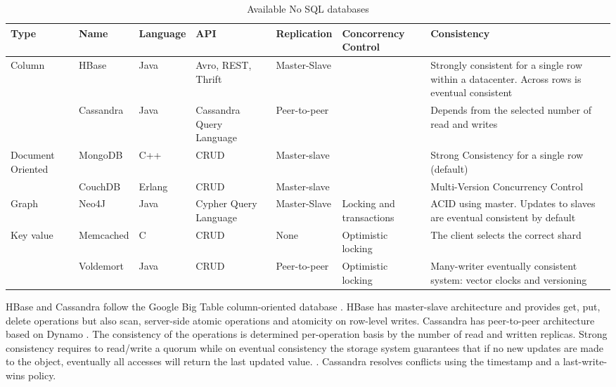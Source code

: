 \setlength\LTleft{-1in}
\setlength\LTright{-1in}
\begin{center}
\begin{table}[ht]
\small
\hspace*{-1cm}
\begin{tabular}{|p{1.5cm}|p{1.8cm}|p{1.6cm}|p{1.8cm}|p{1.7cm}|p{2cm}|p{3.5cm}|}
\hline
\textbf{Type}  & \textbf{Name} & \textbf{Language} & \textbf{API} & \textbf{Replication}   & \textbf{Concorrency Control} & \textbf{Consistency} \\ \hline

\multirow{2}{*}{Column} & HBase & Java  & Avro, REST, Thrift & Master-Slave & & Strongly consistent for a single row within a datacenter. Across rows is eventual consistent \\ \cline{2-7}
	& Cassandra & Java  & Cassandra Query \newline Language & Peer-to-peer  &  & Depends from the selected number of read and writes \\ \hline


\multirow{2}{1.5cm}{Document Oriented} 

	& MongoDB  & C++  & \acs{CRUD}  & Master-slave &   & Strong Consistency for a single row (default)  \\ \cline{2-7} 
	& CouchDB & Erlang   & \acs{CRUD} & Master-slave &     & Multi-Version Concurrency Control  \\ \hline

Graph 
	& Neo4J 	& Java  & Cypher Query \newline Language 	& Master-Slave  & Locking and transactions & ACID using master. Updates to slaves are eventual consistent by default \\ \hline


\multirow{2}{1.5cm}{Key value}         
	& Memcached   & C  	& \acs{CRUD}  & None & Optimistic locking & The client selects the correct shard \\ \cline{2-7} 
	& Voldemort  & Java		& \acs{CRUD} & Peer-to-peer & Optimistic locking & Many-writer eventually consistent system: vector clocks and versioning  \\ \hline
\end{tabular}
\caption{Available No \ac{SQL} databases}
\label{tab:no_sql_databases}
\end{table}
\end{center}

HBase and Cassandra follow the Google Big Table column-oriented database \cite{Chang2008}. HBase has master-slave architecture and provides get, put, delete operations but also scan, server-side atomic operations and atomicity on row-level writes. Cassandra has peer-to-peer architecture based on Dynamo \cite{Decandia2007}. The consistency of the operations is determined per-operation basis by the number of read and written replicas. Strong consistency requires to read/write a quorum while on eventual consistency the storage system guarantees that if no new updates are made to the object, eventually all accesses will return the last updated value. \cite{Decandia2007}. Cassandra resolves conflicts using the timestamp and a last-write-wins policy. 

